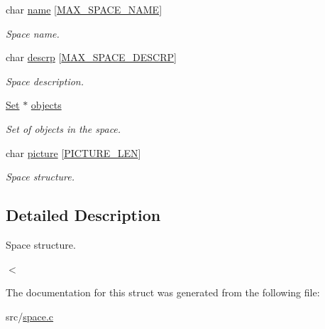 \begin{DoxyCompactItemize}
\mbox{\label{struct__Space_ad69773f9a031624255530244436a211f}} 
char \hyperlink{struct__Space_ad69773f9a031624255530244436a211f}{name} \mbox{[}\hyperlink{space_8h_a95d9e86d5e1a02663f74b6896e5975c6}{M\+A\+X\+\_\+\+S\+P\+A\+C\+E\+\_\+\+N\+A\+ME}\mbox{]}
\begin{DoxyCompactList}\small\item\em Space name. \end{DoxyCompactList}\item 
\mbox{\label{struct__Space_a477314d861f3e27b4dee8087a4f9ec3e}} 
char \hyperlink{struct__Space_a477314d861f3e27b4dee8087a4f9ec3e}{descrp} \mbox{[}\hyperlink{space_8h_aed836b26b3a8e93a4d652bbe81bf66d5}{M\+A\+X\+\_\+\+S\+P\+A\+C\+E\+\_\+\+D\+E\+S\+C\+RP}\mbox{]}
\begin{DoxyCompactList}\small\item\em Space description. \end{DoxyCompactList}\item 
\mbox{\label{struct__Space_a661ed8b0fc8085b6db70188aa5085625}} 
\hyperlink{set_8h_a6d3b7f7c92cbb4577ef3ef7ddbf93161}{Set} $\ast$ \hyperlink{struct__Space_a661ed8b0fc8085b6db70188aa5085625}{objects}
\begin{DoxyCompactList}\small\item\em Set of objects in the space. \end{DoxyCompactList}\item 
\mbox{\label{struct__Space_ab4b3f4af835727b6afe807d2aded4ff2}} 
char \hyperlink{struct__Space_ab4b3f4af835727b6afe807d2aded4ff2}{picture} \mbox{[}\hyperlink{space_8h_aaa978b64998746dc7d6ea67100ce9fb3}{P\+I\+C\+T\+U\+R\+E\+\_\+\+L\+EN}\mbox{]}
\begin{DoxyCompactList}\small\item\em Space structure. \end{DoxyCompactList}\end{DoxyCompactItemize}


\subsection{Detailed Description}
Space structure. 

$<$ 

The documentation for this struct was generated from the following file\+:\begin{DoxyCompactItemize}
\item 
src/\hyperlink{space_8c}{space.\+c}\end{DoxyCompactItemize}
